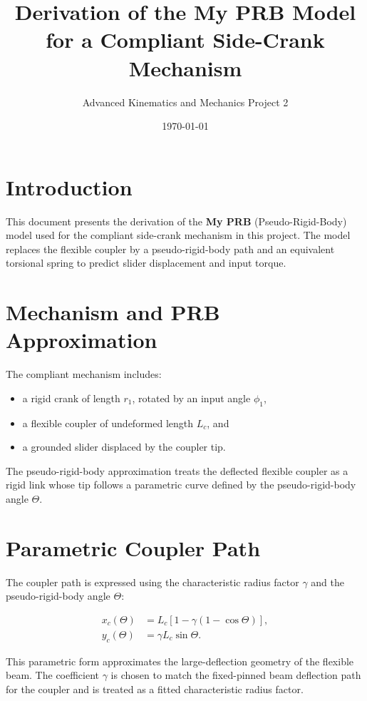 \documentclass[11pt]{article}
\title{Derivation of the My PRB Model for a Compliant Side-Crank Mechanism}
\author{Advanced Kinematics and Mechanics Project 2}
\date{\today}
\begin{document}
\maketitle

\section{Introduction}

This document presents the derivation of the \textbf{My PRB} (Pseudo-Rigid-Body) model used for the compliant side-crank mechanism in this project. The model replaces the flexible coupler by a pseudo-rigid-body path and an equivalent torsional spring to predict slider displacement and input torque.

\section{Mechanism and PRB Approximation}

The compliant mechanism includes:

\begin{itemize}
  \item a rigid crank of length $r_1$, rotated by an input angle $\phi_1$,
  \item a flexible coupler of undeformed length $L_c$, and
  \item a grounded slider displaced by the coupler tip.
\end{itemize}

The pseudo-rigid-body approximation treats the deflected flexible coupler as a rigid link whose tip follows a parametric curve defined by the pseudo-rigid-body angle $\Theta$.

\section{Parametric Coupler Path}

The coupler path is expressed using the characteristic radius factor $\gamma$ and the pseudo-rigid-body angle $\Theta$:

\begin{align}
    x_c(\Theta) &= L_c \left[1 - \gamma\left(1 - \cos\Theta\right)\right], \\
    y_c(\Theta) &= \gamma L_c \sin\Theta.
\end{align}

This parametric form approximates the large-deflection geometry of the flexible beam. The coefficient $\gamma$ is chosen to match the fixed-pinned beam deflection path for the coupler and is treated as a fitted characteristic radius factor.
\end{document}
